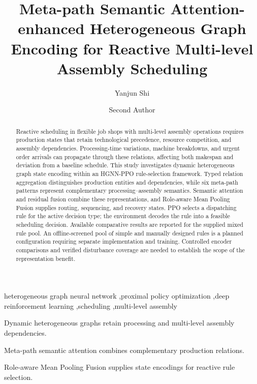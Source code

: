 \begin{frontmatter}

\title{Meta-path Semantic Attention-enhanced Heterogeneous Graph Encoding for Reactive Multi-level Assembly Scheduling}


\author[aff1]{Yanjun Shi}
\author[aff1]{Second Author}

\begin{abstract}
Reactive scheduling in flexible job shops with multi-level assembly operations requires production states that retain technological precedence, resource competition, and assembly dependencies. Processing-time variations, machine breakdowns, and urgent order arrivals can propagate through these relations, affecting both makespan and deviation from a baseline schedule. This study investigates dynamic heterogeneous graph state encoding within an HGNN-PPO rule-selection framework. Typed relation aggregation distinguishes production entities and dependencies, while six meta-path patterns represent complementary processing--assembly semantics. Semantic attention and residual fusion combine these representations, and Role-aware Mean Pooling Fusion supplies routing, sequencing, and recovery states. PPO selects a dispatching rule for the active decision type; the environment decodes the rule into a feasible scheduling decision. Available comparative results are reported for the supplied mixed rule pool. An offline-screened pool of simple and manually designed rules is a planned configuration requiring separate implementation and training. Controlled encoder comparisons and verified disturbance coverage are needed to establish the scope of the representation benefit.
\end{abstract}




\begin{keyword}
heterogeneous graph neural network \sep proximal policy optimization \sep deep reinforcement learning
\sep scheduling \sep multi-level assembly
\end{keyword}

\end{frontmatter}

\begin{highlights}
\item Dynamic heterogeneous graphs retain processing and multi-level assembly dependencies.
\item Meta-path semantic attention combines complementary production relations.
\item Role-aware Mean Pooling Fusion supplies state encodings for reactive rule selection.
\end{highlights}
